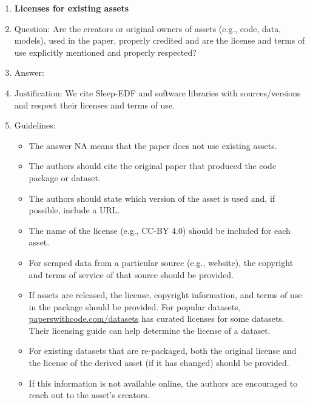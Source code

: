 \documentclass{article}
\begin{document}
\begin{enumerate}
\item {\bf Licenses for existing assets}
    \item[] Question: Are the creators or original owners of assets (e.g., code, data, models), used in the paper, properly credited and are the license and terms of use explicitly mentioned and properly respected?
    \item[] Answer: \answerYes{}
    \item[] Justification: We cite Sleep-EDF and software libraries with sources/versions and respect their licenses and terms of use.
    \item[] Guidelines:
    \begin{itemize}
        \item The answer NA means that the paper does not use existing assets.
        \item The authors should cite the original paper that produced the code package or dataset.
        \item The authors should state which version of the asset is used and, if possible, include a URL.
        \item The name of the license (e.g., CC-BY 4.0) should be included for each asset.
        \item For scraped data from a particular source (e.g., website), the copyright and terms of service of that source should be provided.
        \item If assets are released, the license, copyright information, and terms of use in the package should be provided. For popular datasets, \url{paperswithcode.com/datasets} has curated licenses for some datasets. Their licensing guide can help determine the license of a dataset.
        \item For existing datasets that are re-packaged, both the original license and the license of the derived asset (if it has changed) should be provided.
        \item If this information is not available online, the authors are encouraged to reach out to the asset's creators.
    \end{itemize}


\end{enumerate}
\end{document}
